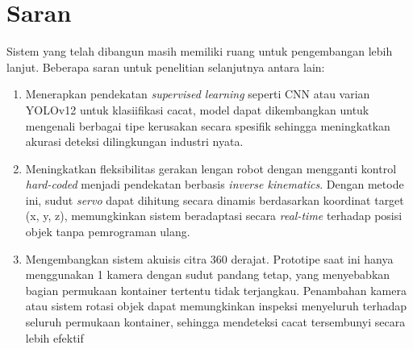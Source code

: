 \section{Saran}
\noindent
Sistem yang telah dibangun masih memiliki ruang untuk pengembangan
lebih lanjut. Beberapa saran untuk penelitian selanjutnya antara lain:
\begin{enumerate}
  \item Menerapkan pendekatan \textit{supervised learning} seperti
    CNN atau varian YOLOv12 untuk klasiifikasi cacat, model dapat
    dikembangkan untuk mengenali berbagai tipe kerusakan secara
    spesifik sehingga meningkatkan akurasi deteksi dilingkungan industri nyata.
  \item Meningkatkan fleksibilitas gerakan lengan robot dengan
    mengganti kontrol \textit{hard-coded} menjadi pendekatan berbasis
    \textit{inverse kinematics}. Dengan metode ini, sudut
    \textit{servo} dapat dihitung secara dinamis berdasarkan
    koordinat target (x, y, z), memungkinkan
    sistem beradaptasi secara \textit{real-time} terhadap posisi
    objek tanpa pemrograman ulang.
  \item Mengembangkan sistem akuisis citra 360 derajat. Prototipe
    saat ini hanya menggunakan 1 kamera dengan sudut pandang tetap,
    yang menyebabkan bagian permukaan kontainer tertentu tidak
    terjangkau. Penambahan kamera atau sistem rotasi objek dapat
    memungkinkan inspeksi menyeluruh terhadap seluruh permukaan
    kontainer, sehingga mendeteksi cacat tersembunyi secara lebih efektif
\end{enumerate}
